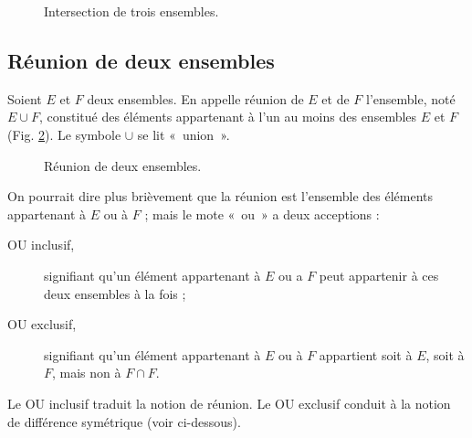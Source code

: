 \documentclass[12pt,parskip=full,chapterprefix=true,a5paper]{scrbook}
\begin{document}
\begin{figure}[ht]
  \centering
  \caption{\label{fig:intersection3ensembles}Intersection de trois ensembles.}
\end{figure}

\subsection*{Réunion de deux ensembles}

Soient \(E\) et \(F\) deux ensembles. En appelle réunion de \(E\) et de \(F\) l'ensemble, noté \(E\cup F\), constitué des éléments appartenant à l'un au moins des ensembles \(E\) et \(F\) (Fig. \ref{fig:reunion}). Le symbole \(\cup\) se lit «~union~».

\begin{figure}[ht]
  \centering
  \caption{\label{fig:reunion}Réunion de deux ensembles.}
\end{figure}

On pourrait dire plus brièvement que la réunion est l'ensemble des éléments appartenant à \(E\) ou à \(F\) ; mais le mote «~ou~» a deux acceptions :
\begin{description}
\item [OU inclusif,]signifiant qu'un élément appartenant à \(E\) ou a \(F\) peut appartenir à ces deux ensembles à la fois ;
\item [OU exclusif,]signifiant qu'un élément appartenant à \(E\) ou à \(F\) appartient soit à \(E\), soit à \(F\), mais non à \(F\cap F\).
\end{description}
Le OU inclusif traduit la notion de réunion. Le OU exclusif conduit à la notion de différence symétrique (voir ci-dessous).
\end{document}
